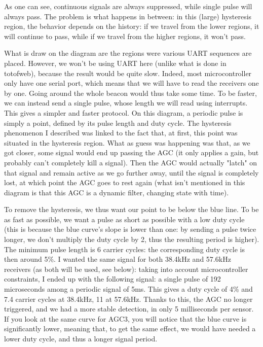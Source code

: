 \documentclass[a4paper,11pt]{article}
\begin{document}
As one can see, continuous signals are always suppressed, while single pulse will always pass. The problem is what happens in between: in this (large) hysteresis region, the behavior depends on the history: if we travel from the lower regions, it will continue to pass, while if we travel from the higher regions, it won't pass. 

What is draw on the diagram are the regions were various UART sequences are placed. However, we won't be using UART here (unlike what is done in totofweb), because the result would be quite slow. Indeed, most microcontroller only have one serial port, which means that we will have to read the receivers one by one. Going around the whole beacon would thus take some time. To be faster, we can instead send a single pulse, whose length we will read using interrupts. This gives a simpler and faster protocol. On this diagram, a periodic pulse is simply a point, defined by its pulse length and duty cycle. The hysteresis phenomenon I described was linked to the fact that, at first, this point was situated in the hysteresis region. What as guess was happening was that, as we got closer, some signal would end up passing the AGC (it only applies a gain, but probably can't completely kill a signal). Then the AGC would actually "latch" on that signal and remain active as we go further away, until the signal is completely lost, at which point the AGC goes to rest again (what isn't mentioned in this diagram is that this AGC is a dynamic filter, changing state with time).

To remove the hysteresis, we thus want our point to be below the blue line. To be as fast as possible, we want a pulse as short as possible with a low duty cycle (this is because the blue curve's slope is lower than one: by sending a pulse twice longer, we don't multiply the duty cycle by 2, thus the resulting period is higher). The minimum pulse length is 6 carrier cycles: the corresponding duty cycle is then around 5\%. I wanted the same signal for both 38.4kHz and 57.6kHz receivers (as both will be used, see below): taking into account microcontroller constraints, I ended up with the following signal: a single pulse of 192 microseconds among a periodic signal of 5ms. This gives a duty cycle of 4\% and 7.4 carrier cycles at 38.4kHz, 11 at 57.6kHz. Thanks to this, the AGC no longer triggered, and we had a more stable detection, in only 5 milliseconds per sensor. If you look at the same curve for AGC3, you will notice that the blue curve is significantly lower, meaning that, to get the same effect, we would have needed a lower duty cycle, and thus a longer signal period.
\end{document}
